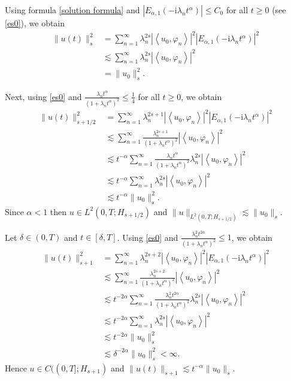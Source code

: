 \documentclass[reqno]{amsart}
\makeatletter
\renewenvironment{proof}[1][\proofname]{\par
  \pushQED{\qed}%
  \normalfont \topsep6\p@\@plus6\p@\relax
  \trivlist
  \item[\hskip\labelsep\bfseries #1\@addpunct{.}]%
}{%
  \popQED\endtrivlist\@endpefalse
}
\numberwithin{equation}{section}
\makeatother
\begin{document}
\begin{proof}
	Using formula \eqref{solution formula} and $|E_{\alpha, 1}\left(-\mathrm{i}\lambda_n t^\alpha\right)|\leq C_0$ for all $t\ge 0$ (see \eqref{es0}), we obtain
		\begin{align}
		\|u(t)\|^2_s&=\sum_{n=1}^{\infty}\lambda_{n}^{2s}|\left\langle u_0, \varphi_n\right\rangle|^2 |E_{\alpha, 1}\left(-\mathrm{i}\lambda_n t^\alpha\right)|^2 \nonumber\\
		&\lesssim\sum_{n=1}^{\infty}\lambda_{n}^{2s}|\left\langle u_0, \varphi_n\right\rangle|^2 \nonumber\\
		&=\|u_0\|^{2}_s.\nonumber
	\end{align}
    
	Next, using \eqref{es0} and $\frac{\lambda_{n}t^{\alpha}}{(1+\lambda_{n}t^{\alpha})^2}\leq \frac{1}{4}$ for all $t\ge 0$, we obtain
	\begin{align}
		\|u(t)\|^2_{s+1/2}&=\sum_{n=1}^{\infty}\lambda_{n}^{2s+1}|\left\langle u_0, \varphi_n\right\rangle|^2 |E_{\alpha, 1}\left(-\mathrm{i}\lambda_n t^\alpha\right)|^2 \nonumber\\
		&\lesssim \sum_{n=1}^{\infty}\frac{\lambda_{n}^{2s+1}}{(1+\lambda_{n}t^{\alpha})^2}|\left\langle u_0, \varphi_n\right\rangle|^2  \nonumber\\
		&\lesssim t^{-\alpha}\sum_{n=1}^{\infty}\frac{\lambda_{n}t^{\alpha}}{(1+\lambda_{n}t^{\alpha})^2}\lambda_{n}^{2s}|\left\langle u_0, \varphi_n\right\rangle|^2  \nonumber\\
		&\lesssim t^{-\alpha}\sum_{n=1}^{\infty}\lambda_{n}^{2s}|\left\langle u_0, \varphi_n\right\rangle|^2 \nonumber\\
		&\lesssim t^{-\alpha}\|u_0\|^{2}_s. \nonumber
	\end{align}
	Since $\alpha<1$ then $u\in L^2(0,T;H_{s+1/2})$ and $\|u\|_{L^2(0,T;H_{s+1/2})}\lesssim \|u_0\|_s$.
    
    Let $\delta\in (0,T)$ and $t\in [\delta, T]$. Using \eqref{es0} and $\frac{\lambda_{n}^2t^{2\alpha}}{(1+\lambda_{n}t^{\alpha})^2}\leq 1$, we obtain
	\begin{align}
		\|u(t)\|^2_{s+1}&=\sum_{n=1}^{\infty}\lambda_{n}^{2s+2}|\left\langle u_0, \varphi_n\right\rangle|^2 |E_{\alpha, 1}\left(-\mathrm{i}\lambda_n t^\alpha\right)|^2 \nonumber\\
		&\lesssim \sum_{n=1}^{\infty}\frac{\lambda_{n}^{2s+2}}{(1+\lambda_{n}t^{\alpha})^2}|\left\langle u_0, \varphi_n\right\rangle|^2  \nonumber\\
		&\lesssim t^{-2\alpha}\sum_{n=1}^{\infty}\frac{\lambda_{n}^2t^{2\alpha}}{(1+\lambda_{n}t^{\alpha})^2}\lambda_{n}^{2s}|\left\langle u_0, \varphi_n\right\rangle|^2  \nonumber\\
		&\lesssim t^{-2\alpha}\sum_{n=1}^{\infty}\lambda_{n}^{2s}|\left\langle u_0, \varphi_n\right\rangle|^2 \nonumber\\
		&\lesssim t^{-2\alpha}\|u_0\|^{2}_s  \nonumber\\
		&\lesssim \delta^{-2\alpha}\|u_0\|^{2}_s<\infty. \nonumber
	\end{align}
	Hence $u\in C((0,T];H_{s+1})$ and $\|u(t)\|_{s+1}\lesssim t^{-\alpha}\|u_0\|_s$.
	\end{proof}
\end{document}
